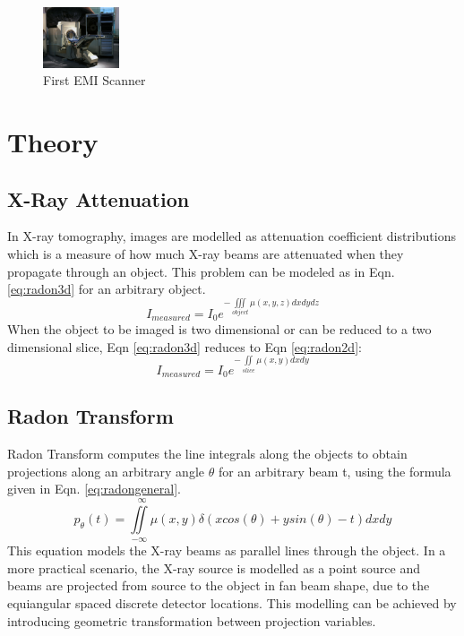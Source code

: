 \documentclass[journal]{IEEEtran}
\begin{document}
\begin{figure}[h]
\centering
\includegraphics[width=0.2\textwidth]{images/CT.jpg}
\caption{First EMI Scanner \cite{emict}}\label{fig:CT1010}
\end{figure}

\vfill{\null}

\section{Theory} \label{sec:theory}
\subsection{X-Ray Attenuation}
In X-ray tomography, images are modelled as attenuation coefficient distributions which is a measure of how much X-ray beams are attenuated when they propagate through an object. This problem can be modeled as in Eqn. \ref{eq:radon3d} for an arbitrary object.
\begin{equation} 
	I_{measured} = I_0 e^{-\iiint\limits_{object}\mu(x,y,z)dxdydz}
	\label{eq:radon3d}
\end{equation}
When the object to be imaged is two dimensional or can be reduced to a two dimensional slice, Eqn \ref{eq:radon3d} reduces to Eqn \ref{eq:radon2d}:
\begin{equation}
	I_{measured} = I_0 e^{-\iint\limits_{slice}\mu(x,y)dxdy}
	\label{eq:radon2d}
\end{equation}
\subsection{Radon Transform}
Radon Transform computes the line integrals along the objects to obtain projections along an arbitrary angle $\theta$ for an arbitrary beam t, using the formula given in Eqn. \ref{eq:radongeneral}.
\begin{equation}
	p_{\theta}(t) = \iint\limits_{-\infty}^{\ \ \ \infty}\mu(x,y)\delta(xcos(\theta)+ysin(\theta)-t)dxdy
	\label{eq:radongeneral}
\end{equation}
This equation models the X-ray beams as parallel lines through the object. In a more practical scenario, the X-ray source is modelled as a point source and beams are projected from source to the object in fan beam shape, due to the equiangular spaced discrete detector locations. This modelling can be achieved by introducing geometric transformation between projection variables. 
\end{document}
